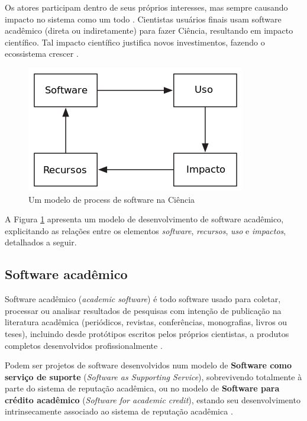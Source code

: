 Os atores participam dentro de seus próprios interesses, mas sempre causando
impacto no sistema como um todo \cite{manikas2013software}.
Cientistas usuários finais usam software acadêmico (direta ou indiretamente)
para fazer Ciência, resultando em impacto científico. Tal impacto científico
justifica novos investimentos, fazendo o ecossistema crescer
\cite{howison2015understanding}.

\begin{figure}[h]
  \center
  \includegraphics[scale=0.5]{imagens/process-model-scientific-software-dia.png}
  \caption{Um modelo de process de software na Ciência~\cite{howison2015understanding}}
  \label{process-model-scientific-software}
\end{figure}

A Figura \ref{process-model-scientific-software} apresenta um modelo de
desenvolvimento de software acadêmico, explicitando as relações entre os
elementos \textit{software}, \textit{recursos}, \textit{uso} e
\textit{impactos}, detalhados a seguir.

\subsection{Software acadêmico}

Software acadêmico ({\it academic software}) é todo software usado para
coletar, processar ou analisar resultados de pesquisas com intenção de
publicação na literatura acadêmica (periódicos, revistas, conferências,
monografias, livros ou teses), incluindo desde protótipos escritos pelos
próprios cientistas, a produtos completos desenvolvidos profissionalmente
\cite{allen2017engineering}.

Podem ser projetos de software desenvolvidos num modelo de {\bf Software como
serviço de suporte} ({\it Software as Supporting Service}), sobrevivendo
totalmente à parte do sistema de reputação acadêmica, ou no modelo de {\bf
Software para crédito acadêmico} ({\it Software for academic credit}), estando
seu desenvolvimento intrinsecamente associado ao sistema de reputação acadêmica
\cite{howison2011scientific}.


